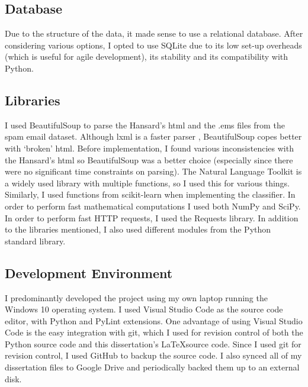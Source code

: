 \documentclass[12pt,a4paper,twoside,openright]{report}
\begin{document}
\subsection{Database} \label{prep-database}

Due to the structure of the data, it made sense to use a relational database. After considering various options, I opted to use SQLite due to its low set-up overheads (which is useful for agile development), its stability and its compatibility with Python.

\subsection{Libraries} \label{prep-tools-libs}

I used BeautifulSoup to parse the Hansard's html and the .ems files from the spam email dataset. Although lxml is a faster parser \cite{parsing}, BeautifulSoup copes better with `broken' html. Before implementation, I found various inconsistencies with the Hansard's html so BeautifulSoup was a better choice (especially since there were no significant time constraints on parsing). The Natural Language Toolkit is a widely used library with multiple functions, so I used this for various things. Similarly, I used functions from scikit-learn when implementing the classifier. In order to perform fast mathematical computations I used both NumPy and SciPy. In order to perform fast HTTP requests, I used the Requests library. In addition to the libraries mentioned, I also used different modules from the Python standard library.

\subsection{Development Environment}

I predominantly developed the project using my own laptop running the Windows 10 operating system. I used Visual Studio Code as the source code editor, with Python and PyLint extensions. One advantage of using Visual Studio Code is the easy integration with git, which I used for revision control of both the Python source code and this dissertation's \LaTeX \space source code. Since I used git for revision control, I used GitHub to backup the source code. I also synced all of my dissertation files to Google Drive and periodically backed them up to an external disk.
\end{document}
